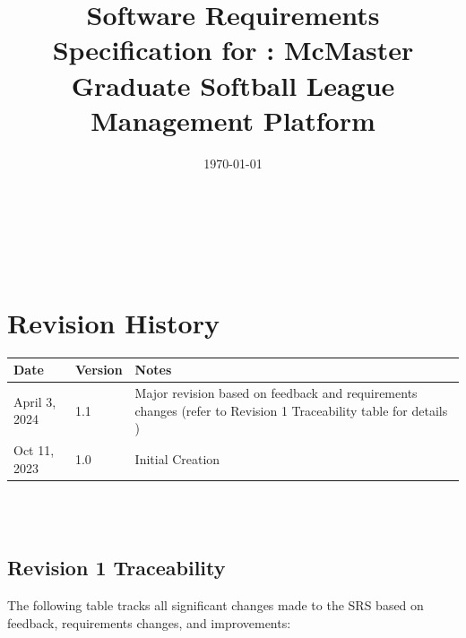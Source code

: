 \documentclass[12pt, titlepage]{article}
\begin{document}
\title{Software Requirements Specification for \progname: McMaster Graduate Softball League Management Platform} 
\author{\authname}
\date{\today}
	
\maketitle

~\newpage


\tableofcontents

\listoftables

~\newpage

\section*{Revision History}

\begin{tabularx}{\textwidth}{p{3cm}p{2cm}X}
\toprule {\textbf{Date}} & {\textbf{Version}} & {\textbf{Notes}}\\
\midrule
April 3, 2024 & 1.1 & Major revision based on feedback and requirements changes (refer to Revision 1 Traceability table for details )\\
Oct 11, 2023 & 1.0 & Initial Creation \\
\bottomrule
\end{tabularx}

~\\

~\newpage

\subsection{Revision 1 Traceability}
The following table tracks all significant changes made to the SRS based on feedback, requirements changes, and improvements:

\newcommand{\issueLink}[1]{\href{https://github.com/dcheung11/team-6-capstone-project/issues/#1}{Issue #1}}
\end{document}
